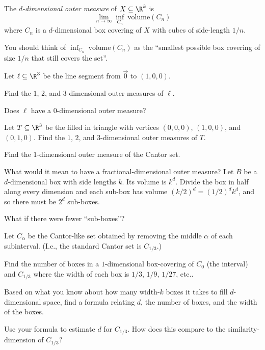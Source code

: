 	\begin{definition}
		The \emph{$d$-dimensional outer measure} of $X\subseteq \R^k$ is
		\[
			\lim_{n\to\infty} \inf_{C_n}\  \text{volume}(C_n)
		\]
		where $C_n$ is a $d$-dimensional box covering of $X$ with cubes of side-length $1/n$.
	\end{definition}
	You should think of $\inf_{C_n}\  \text{volume}(C_n)$ as the ``smallest possible box covering of size $1/n$ that
	still covers the set''.

	\question
	Let $\ell\subseteq \R^3$ be the line segment from $\vec 0$ to $(1,0,0)$.
	\begin{parts}
		\item Find the $1$, $2$, and $3$-dimensional outer measures of $\ell$.
		\item Does $\ell$ have a $0$-dimensional outer measure?
		\item Let $T\subseteq \R^3$ be the filled in triangle with vertices $(0,0,0)$, $(1,0,0)$,
			and $(0,1,0)$. Find the $1$, $2$, and $3$-dimensional outer measures of $T$.
		\item Find the $1$-dimensional outer measure of the Cantor set.
	\end{parts}

	\newpage
	What would it mean to have a fractional-dimensional outer measure? Let $B$ be a $d$-dimensional
	box with side lengths $k$. Its volume is $k^d$. Divide the box in half along every dimension and 
	each sub-box has volume $(k/2)^d=(1/2)^dk^d$, and so there must be $2^d$ sub-boxes.

	What if there were fewer ``sub-boxes''?

	\question
	Let $C_\alpha$ be the Cantor-like set obtained by removing the middle $\alpha$ of each subinterval.
	(I.e., the standard Cantor set is $C_{1/3}$.)
	\begin{parts}
		\item Find the number of boxes in a $1$-dimensional box-covering of $C_{0}$ 
			(the interval) and  $C_{1/3}$ where the width of each box is $1/3$, $1/9$, $1/27$, etc..
		\item Based on what you know about how many width-$k$ boxes it takes to fill $d$-dimensional space,
			find a formula relating $d$, the number of boxes, and the width of the boxes.
		\item Use your formula to estimate $d$ for $C_{1/3}$. How does this compare to the similarity-dimension
			of $C_{1/3}$?
	\end{parts}


